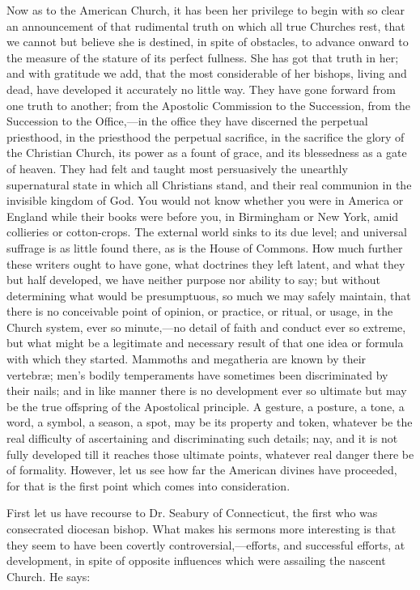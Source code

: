 Now as to the American Church, it has been her
privilege to begin with so clear an announcement of that rudimental
truth on which all true Churches rest, that we cannot but believe she
is destined, in spite of obstacles, to advance onward to the measure
of the stature of its perfect fullness. She has got that truth in her;
and with gratitude we add, that the most considerable of her
bishops, living and dead, have developed it accurately no little way.
They have gone forward from one truth to another; from the Apostolic
Commission to the Succession, from the Succession to the Office,—in
the office they have discerned the perpetual priesthood, in the
priesthood the perpetual sacrifice, in the sacrifice the glory of the
Christian Church, its power as a fount of grace, and its blessedness
as a gate of heaven. They had felt and taught most persuasively the
unearthly supernatural state in which all Christians stand, and their
real communion in the invisible kingdom of God. You would not know
whether you were in America or England while their books were before
you, in Birmingham or New York, amid collieries or cotton-crops. The
external world sinks to its due level; and universal suffrage is as
little found there, as is the House of Commons. How much further these
writers ought to have gone, what doctrines they left latent, and what
they but half developed, we have neither purpose nor ability to say;
but without determining what would be presumptuous, so much we may
safely maintain, that there is no conceivable point of opinion, or
practice, or ritual, or usage, in the Church system, ever so
minute,—no detail of faith and conduct ever so extreme, but what
might be a legitimate and necessary result of that one idea or formula
with which they started. Mammoths and megatheria are known by their
vertebræ; men's bodily temperaments have sometimes been discriminated
by their nails; and in like manner there is no development ever so
ultimate but may be the true offspring of the Apostolical principle. A
gesture, a posture, a tone, a word, a symbol, a season, a spot, may be
its property and token, whatever be the real difficulty of
ascertaining and discriminating such details; nay, and it is not
fully developed till it reaches those ultimate points, whatever real
danger there be of formality. However, let us see how far the American
divines have proceeded, for that is the first point which comes into
consideration.

First let us have recourse to Dr. Seabury of
Connecticut, the first who was consecrated diocesan bishop. What makes
his sermons more interesting is that they seem to have been covertly
controversial,—efforts, and successful efforts, at development, in
spite of opposite influences which were assailing the nascent Church.
He says:

